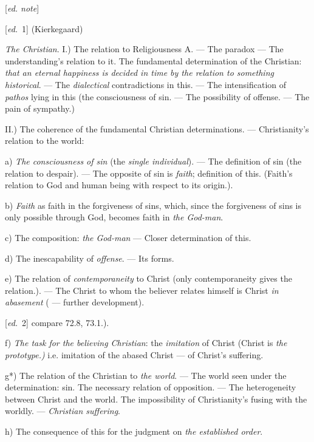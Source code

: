 \documentclass[12pt,a4paper,openany]{book}
\newcommand{\kpage}[1]{\marginnote{\footnotesize\textit{[#1]}}}
\newcommand{\ed}[1]{{\small[\textit{ed.}\ #1]}}
\newcommand{\ednote}[1]{{\small[\textit{ed. note}]}}
\begin{document}
\ednote{}

\ed{1} (Kierkegaard)

\emph{The Christian}. I.) The relation to Religiousness A. --- The paradox --- The understanding's
relation to it. The fundamental determination of the Christian: \emph{that an eternal
happiness is decided in time by the relation to something historical}. --- The \emph{dialectical}
contradictions in this. --- The intensification of \emph{pathos} lying in this (the consciousness of sin.
--- The possibility of offense. --- The pain of sympathy.)

II.) The coherence of the fundamental Christian determinations. --- Christianity's
relation to the world:

a) \emph{The consciousness of sin} (the \emph{single individual}). --- The definition of sin (the relation to
despair). --- The opposite of sin is \emph{faith}; definition of this.
(Faith's relation to God and human being with respect to
its origin.).

b) \emph{Faith} as faith in the forgiveness of sins, which, since the forgiveness of sins is only
possible through God, becomes faith in \emph{the God-man}.

c) The composition: \emph{the God-man} --- Closer determination of this.

d) The inescapability of \emph{offense}. --- Its forms.

e) The relation of \emph{contemporaneity} to Christ (only contemporaneity gives the relation.).
--- The Christ to whom the believer relates himself is
Christ \emph{in abasement} ( --- further development).

\ed{2} compare 72.8, 73.1.).

\kpage{157}f) \emph{The task for the believing Christian}: the \emph{imitation} of Christ (Christ is \emph{the prototype.)}
i.e. imitation of the abased Christ --- of Christ's
suffering.

g*) The relation of the Christian to \emph{the world}. --- The world seen under the determination:
sin. The necessary relation of opposition. --- The heterogeneity
between Christ and the world. The impossibility of Christianity's
fusing with the worldly. --- \emph{Christian suffering}.

h) The consequence of this for the judgment on \emph{the established order}.
\end{document}
